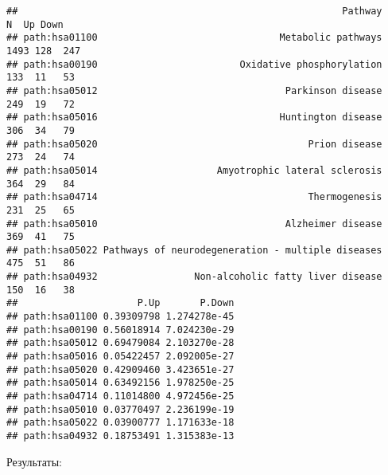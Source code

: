 \documentclass[
]{article}
\begin{document}
\begin{verbatim}
##                                                         Pathway    N  Up Down
## path:hsa01100                                Metabolic pathways 1493 128  247
## path:hsa00190                         Oxidative phosphorylation  133  11   53
## path:hsa05012                                 Parkinson disease  249  19   72
## path:hsa05016                                Huntington disease  306  34   79
## path:hsa05020                                     Prion disease  273  24   74
## path:hsa05014                     Amyotrophic lateral sclerosis  364  29   84
## path:hsa04714                                     Thermogenesis  231  25   65
## path:hsa05010                                 Alzheimer disease  369  41   75
## path:hsa05022 Pathways of neurodegeneration - multiple diseases  475  51   86
## path:hsa04932                 Non-alcoholic fatty liver disease  150  16   38
##                     P.Up       P.Down
## path:hsa01100 0.39309798 1.274278e-45
## path:hsa00190 0.56018914 7.024230e-29
## path:hsa05012 0.69479084 2.103270e-28
## path:hsa05016 0.05422457 2.092005e-27
## path:hsa05020 0.42909460 3.423651e-27
## path:hsa05014 0.63492156 1.978250e-25
## path:hsa04714 0.11014800 4.972456e-25
## path:hsa05010 0.03770497 2.236199e-19
## path:hsa05022 0.03900777 1.171633e-18
## path:hsa04932 0.18753491 1.315383e-13
\end{verbatim}

Результаты:
\end{document}

